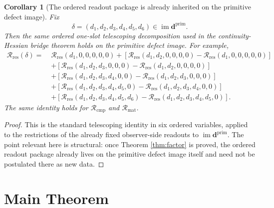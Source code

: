 \documentclass[11pt]{article}
\newcommand{\PrimDefectTuple}{\mathbf d^{\mathrm{prim}}}
\newcommand{\ResidualRead}{\mathscr R_{\mathrm{res}}}
\newcommand{\CompletionRead}{\mathscr R_{\mathrm{cmp}}}
\newcommand{\MatterRead}{\mathscr R_{\mathrm{mat}}}
\newtheorem{corollary}{Corollary}
\begin{document}
\begin{corollary}[The ordered readout package is already inherited on the primitive defect image]
\label{cor:tel}
Fix
\[
\delta=(d_1,d_2,d_3,d_4,d_5,d_6)\in\operatorname{im}\PrimDefectTuple.
\]
Then the same ordered one-slot telescoping decomposition used in the continuity-Hessian bridge theorem holds on the primitive defect image. For example,
\begin{equation}
\begin{aligned}
\ResidualRead(\delta)
=\;&
\ResidualRead(d_1,0,0,0,0,0)
+[\ResidualRead(d_1,d_2,0,0,0,0)-\ResidualRead(d_1,0,0,0,0,0)]
\\
&+[\ResidualRead(d_1,d_2,d_3,0,0,0)-\ResidualRead(d_1,d_2,0,0,0,0)]
\\
&+[\ResidualRead(d_1,d_2,d_3,d_4,0,0)-\ResidualRead(d_1,d_2,d_3,0,0,0)]
\\
&+[\ResidualRead(d_1,d_2,d_3,d_4,d_5,0)-\ResidualRead(d_1,d_2,d_3,d_4,0,0)]
\\
&+[\ResidualRead(d_1,d_2,d_3,d_4,d_5,d_6)-\ResidualRead(d_1,d_2,d_3,d_4,d_5,0)].
\end{aligned}
\label{eq:tel}
\end{equation}
The same identity holds for \(\CompletionRead\) and \(\MatterRead\).
\end{corollary}

\begin{proof}
This is the standard telescoping identity in six ordered variables, applied to the restrictions of the already fixed observer-side readouts to \(\operatorname{im}\PrimDefectTuple\). The point relevant here is structural: once Theorem \ref{thm:factor} is proved, the ordered readout package already lives on the primitive defect image itself and need not be postulated there as new data.
\end{proof}

\section{Main Theorem}
\end{document}

